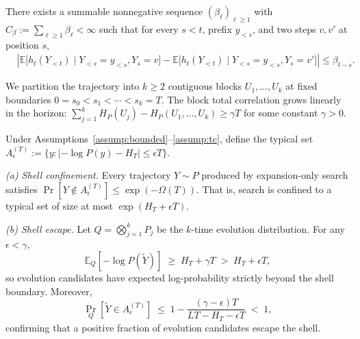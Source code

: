 \documentclass{llmxive}
\begin{document}
\begin{assumption}
\label{assump:decay}
There exists a summable nonnegative sequence $(\beta_\ell)_{\ell\ge1}$ with
$C_\beta:=\sum_{\ell\ge1}\beta_\ell<\infty$ such that for every $s<t$,
prefix $y_{<s}$, and two steps $v,v'$ at position $s$,
\begin{align}
&\left|
\mathbb{E}\!\big[h_t(Y_{<t})\mid Y_{<s}=y_{<s},Y_s=v\big]
-
\mathbb{E}\!\big[h_t(Y_{<t})\mid Y_{<s}=y_{<s},Y_s=v'\big]
\right|
\le \beta_{t-s}.
\end{align}
\end{assumption}

\begin{assumption}
\label{assump:tc}
We partition the trajectory into $k \geq 2$ contiguous blocks $U_1, \dots, U_k$ at fixed boundaries $0 = s_0 < s_1 < \cdots < s_k = T$. The block total correlation grows linearly in the horizon:
$\sum_{j=1}^k H_P(U_j) - H_P(U_1, \ldots, U_k) \geq \gamma T$
for some constant $\gamma > 0$.  
\end{assumption}

\begin{theorem}
\label{thm:shell}
Under Assumptions~\ref{assump:bounded}--\ref{assump:tc}, define the typical set $A_\epsilon^{(T)}:=\{y:|-\log P(y)-H_T|\le\epsilon T\}$.

\textit{(a) Shell confinement.} Every trajectory $Y \sim P$ produced by expansion-only search satisfies $\Pr[Y \notin A_\epsilon^{(T)}] \leq \exp(-\Omega(T))$. That is, search is confined to a typical set of size at most $\exp(H_T + \epsilon T)$.

\textit{(b) Shell escape.} Let $Q = \bigotimes_{j=1}^k P_j$ be the $k$-time evolution distribution. For any $\epsilon < \gamma$,
\begin{equation}
  \mathbb{E}_Q[-\log P(\widetilde{Y})] \;\geq\; H_T + \gamma T \;>\; H_T + \epsilon T,
  \label{eq:escape-expectation}
\end{equation}
so evolution candidates have expected log-probability strictly beyond the shell boundary. Moreover,
\begin{equation}
  \Pr_Q\!\left[\widetilde{Y} \in A_\epsilon^{(T)}\right] \;\leq\; 1 - \frac{(\gamma - \epsilon)T}{LT - H_T - \epsilon T} \;<\; 1,
  \label{eq:escape-prob}
\end{equation}
confirming that a positive fraction of evolution candidates escape the shell.
\end{theorem}
\end{document}
